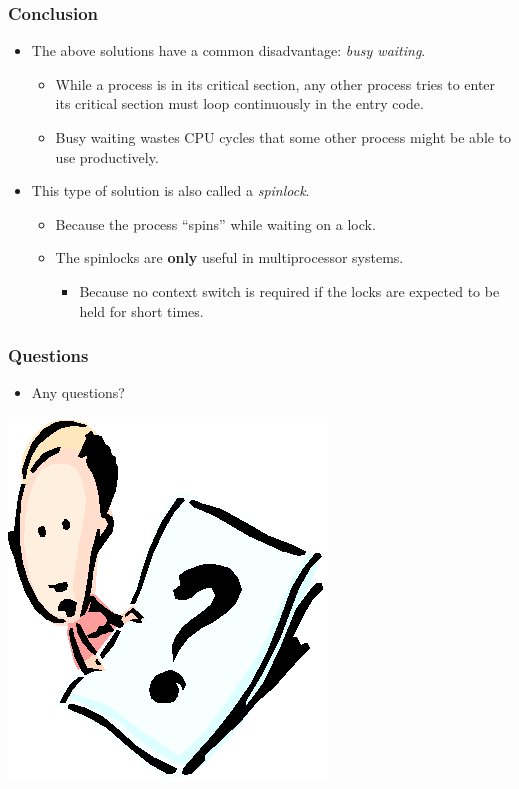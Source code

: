\documentclass[CJKutf8,xcolor=pdftex,dvipsnames,table]{beamer}
\begin{document}
\begin{CJK*}{UTF8}{song}
  \begin{frame}
  \frametitle{Conclusion} \pause
  \begin{itemize}
  \item{The above solutions have a common disadvantage: \emph{busy waiting}.} \pause
    \begin{itemize}
    \item{While a process is in its critical section, any other process tries to enter its critical section must loop continuously in the entry code.} \pause
    \item{Busy waiting wastes CPU cycles that some other process might be able to use productively.} \pause
    \end{itemize}
  \item{This type of solution is also called a \emph{spinlock}.} \pause
    \begin{itemize}
    \item{Because the process ``spins'' while waiting on a lock.} \pause
    \item{The spinlocks are \textbf{only} useful in multiprocessor systems.} \pause
      \begin{itemize}
      \item{Because no context switch is required if the locks are expected to be held for short times.}
      \end{itemize}
    \end{itemize}
  \end{itemize}
  \end{frame}

  \begin{frame}
  \frametitle{Questions}
  \begin{itemize}
  \item{Any questions?}
  \end{itemize}
  \begin{center}
    \includegraphics[scale=.5]{question}
  \end{center}
  \end{frame}


\end{CJK*}
\end{document}

